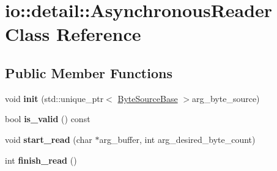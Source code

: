 \hypertarget{classio_1_1detail_1_1AsynchronousReader}{}\section{io\+:\+:detail\+:\+:Asynchronous\+Reader Class Reference}
\label{classio_1_1detail_1_1AsynchronousReader}
\subsection*{Public Member Functions}
\begin{DoxyCompactItemize}
\item 
\mbox{\label{classio_1_1detail_1_1AsynchronousReader_a12ed45f881a671b473d95ded7ad1474c}} 
void {\bfseries init} (std\+::unique\+\_\+ptr$<$ \hyperlink{classio_1_1ByteSourceBase}{Byte\+Source\+Base} $>$arg\+\_\+byte\+\_\+source)
\item 
\mbox{\label{classio_1_1detail_1_1AsynchronousReader_ab6b6f8483008208fc3f529f94c7125e2}} 
bool {\bfseries is\+\_\+valid} () const
\item 
\mbox{\label{classio_1_1detail_1_1AsynchronousReader_a9818851dbb994042d0d84183220e71c6}} 
void {\bfseries start\+\_\+read} (char $\ast$arg\+\_\+buffer, int arg\+\_\+desired\+\_\+byte\+\_\+count)
\item 
\mbox{\label{classio_1_1detail_1_1AsynchronousReader_a94520530423e9bfeb04c23ea4e3a8786}} 
int {\bfseries finish\+\_\+read} ()
\end{DoxyCompactItemize}
